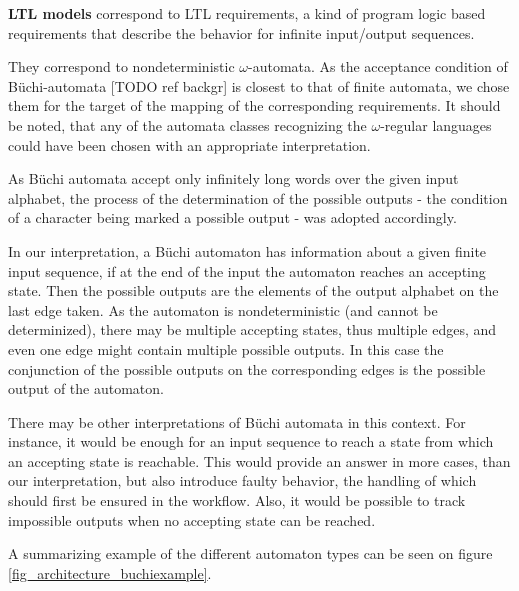 \textbf{LTL models} correspond to LTL requirements, a kind of program logic based requirements that describe the behavior for infinite input/output sequences.%

They correspond to nondeterministic $\omega$-automata. As the acceptance condition of Büchi-automata [TODO ref backgr] is closest to that of finite automata, we chose them for the target of the mapping of the corresponding requirements. It should be noted, that any of the automata classes recognizing the $\omega$-regular languages could have been chosen with an appropriate interpretation.

As Büchi automata accept only infinitely long words over the given input alphabet, the process of the determination of the possible outputs - the condition of a character being marked a possible output - was adopted accordingly.

In our interpretation, a Büchi automaton has information about a given finite input sequence, if at the end of the input the automaton reaches an accepting state. Then the possible outputs are the elements of the output alphabet on the last edge taken. As the automaton is nondeterministic (and cannot be determinized), there may be multiple accepting states, thus multiple edges, and even one edge might contain multiple possible outputs. In this case the conjunction of the possible outputs on the corresponding edges is the possible output of the automaton.  

There may be other interpretations of Büchi automata in this context. For instance, it would be enough for an input sequence to reach a state from which an accepting state is reachable. This would provide an answer in more cases, than our interpretation, but also introduce faulty behavior, the handling of which should first be ensured in the workflow. Also, it would be possible to track impossible outputs when no accepting state can be reached.

A summarizing example of the different automaton types can be seen on figure \ref{fig_architecture_buchiexample}.

